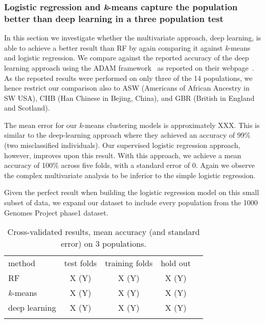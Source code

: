 \documentclass{llncs}
\newcommand{\kMeans}{\textit{k}-means}
\begin{document}
{%
\subsubsection{Logistic regression and \kMeans{} capture the population better than deep learning in a three population test}
In this section we investigate whether the multivariate approach, deep learning, is able to achieve a better result than RF by again comparing it against \kMeans{} and logistic regression.  
We compare against the reported accuracy of the deep learning approach using the {\sc ADAM} framework~\cite{Massie2013} as reported on their webpage~\cite{Ferguson}. 
As the reported results were performed on only three of the 14 populations, we hence restrict our comparison also to ASW (Americans of African Ancestry in SW USA), CHB (Han Chinese in Bejing, China), and GBR (British in England and Scotland).

The mean error for our \kMeans{} clustering models is approximately XXX. This is similar to the deep-learning approach where they achieved an accuracy of 99\% (two misclassified individuals). Our supervised logistic regression approach, however, improves upon this result.
With this approach, we achieve a mean accuracy of 100\% across five folds, with a standard error of 0. %
Again we observe the complex multivariate analysis to be inferior to the simple logistic regression.
 

Given the perfect result when building the logistic regression model on this small subset of data, we expand our dataset to include every population from the 1000 Genomes Project phase1 dataset.  




\begin{table}
\caption{Cross-validated results, mean accuracy (and standard error) on 3 populations.}
\begin{center}
\renewcommand{\arraystretch}{1.4}
\setlength\tabcolsep{3pt}
\begin{tabular}{lcccc}
\hline\noalign{\smallskip}
method  & test folds & training folds & hold out \\
RF  & X (Y) & X (Y) & X (Y) \\
\kMeans & X (Y) & X (Y) & X (Y) \\
deep learning & X (Y) & X (Y) & X (Y) \\
\noalign{\smallskip}
\hline
\end{tabular}
\end{center}
\end{table}




}
\end{document}
